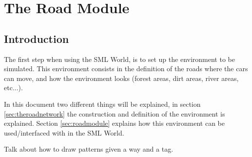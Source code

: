 \graphicspath{ {SectionTheRoadModule/Images/} }


\section{The Road Module}
\label{sec:the_road_module}



\subsection{Introduction}

The first step when using the SML World, is to set up the environment to be simulated. This environment consists in the definition of the roads where the cars can move, and how the environment looks (forest areas, dirt areas, river areas, etc...).

In this document two different things will be explained, in section \ref{sec:theroadnetwork} the construction and definition of the environment is explained. Section \ref{sec:roadmodule} explains how this environment can be used/interfaced with in the SML World.







Talk about how to draw patterns given a way and a tag.

